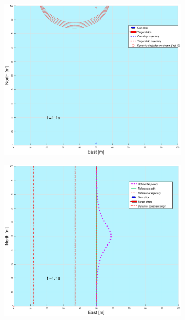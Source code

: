 \begin{figure}[ht!] %
    \begin{subfigure}[b]{0.49\textwidth}
        \centering
        \includegraphics[width=\textwidth]{Images/Figures/enkel_HO/_Simple_0fig1_time=1}
    \end{subfigure}
    \hfill
    \begin{subfigure}[b]{0.499\textwidth}
        \centering
        \includegraphics[width=\textwidth]{Images/Figures/enkel_HO/_Simple_0fig999_time=1}

\end{subfigure}
\end{figure}

